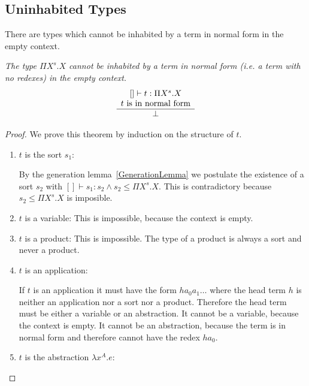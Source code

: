 \subsection{Uninhabited Types}



There are types which cannot be inhabited by a term in normal form in the empty
context.

\begin{theorem}
    \emph{The type $\Pi X^s. X$ cannot be inhabited by a term in normal form
    (i.e. a term with no redexes) in the empty context.}
    $$
    \begin{array}{c} 
        [] \vdash t: \Pi X^s. X
        \\
        t \text{ is in normal form}
     \\ \hline 
        \perp
    \end{array}
    $$

    \begin{proof}
        We prove this theorem by induction on the structure of $t$.
        \begin{enumerate}
        \item $t$ is the sort $s_1$:

            By the generation lemma~\ref{GenerationLemma} we postulate the
                existence of a sort $s_2$ with $[] \vdash s_1: s_2 \land s_2 \le
                \Pi X^s. X$. This is
                contradictory because $s_2 \le \Pi X^s.X$ is imposible.

        \item $t$ is a variable:
            This is impossible, because the context is empty.

        \item $t$ is a product:
            This is impossible. The type of a product is always a sort and never
                a product.

        \item $t$ is an application:

            If $t$ is an application it must have the form $h a_0 a_1 \ldots$
                where the head term $h$ is neither an application nor a sort nor
                a product. Therefore the head term must be either a variable or
                an abstraction. It cannot be a variable, because the context is
                empty. It cannot be an abstraction, because the term is in
                normal form and therefore cannot have the redex $h a_0$.

        \item $t$ is the abstraction $\lambda x^A. e$:


\end{enumerate}
\end{proof}
\end{theorem}
